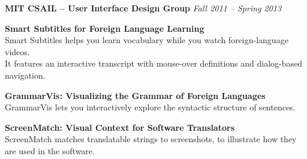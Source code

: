 \documentclass[margin,line]{resume}
\begin{document}
\begin{resume}
\textbf{MIT CSAIL -- User Interface Design Group} \hfill \textsl{Fall 2011 -- Spring 2013}

\textbf{Smart Subtitles for Foreign Language Learning}\\ %
Smart Subtitles helps you learn vocabulary while you watch foreign-language videos.\\
It features an interactive transcript with mouse-over definitions and dialog-based navigation.

\textbf{GrammarVis: Visualizing the Grammar of Foreign Languages}\\ %
GrammarVis lets you interactively explore the syntactic structure of sentences.

\textbf{ScreenMatch: Visual Context for Software Translators}\\ %
ScreenMatch matches translatable strings to screenshots, to illustrate how they are used in the software.



\end{resume}
\end{document}
